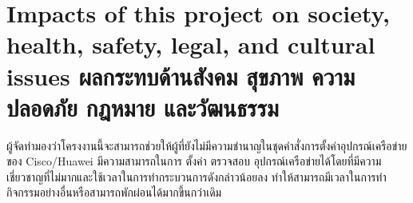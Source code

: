 \section{\ifenglish%
Impacts of this project on society, health, safety, legal, and cultural issues
\else%
ผลกระทบด้านสังคม สุขภาพ ความปลอดภัย กฎหมาย และวัฒนธรรม
\fi}

\hspace{0.5in}
ผู้จัดทำมองว่าโครงงานนี้จะสามารถช่วยให้ผู้ที่ยังไม่มีความชำนาญในชุดคำสั่งการตั้งค่าอุปกรณ์เครือข่ายของ Cisco/Huawei มีความสามารถในการ ตั้งค่า ตรวจสอบ อุปกรณ์เครือข่ายได้โดยที่มีความเชี่ยวชาญที่ไม่มากและใช้เวลาในการทำกระบวนการดังกล่าวน้อยลง ทำให้สามารถมีเวลาในการทำกิจกรรมอย่างอื่นหรือสามารถพักผ่อนได้มากขึ้นกว่าเดิม

